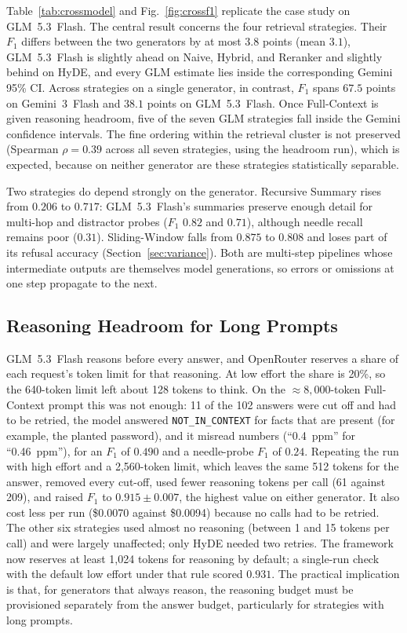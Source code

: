 \documentclass[conference,a4paper,10pt]{IEEEtran}
\begin{document}
Table~\ref{tab:crossmodel} and Fig.~\ref{fig:crossf1} replicate the case study on GLM~5.3~Flash.
The central result concerns the four retrieval strategies.
Their $F_1$ differs between the two generators by at most $3.8$ points (mean $3.1$), GLM~5.3~Flash is slightly ahead on Naive, Hybrid, and Reranker and slightly behind on HyDE, and every GLM estimate lies inside the corresponding Gemini 95\% CI.
Across strategies on a single generator, in contrast, $F_1$ spans $67.5$ points on Gemini~3~Flash and $38.1$ points on GLM~5.3~Flash.
Once Full-Context is given reasoning headroom, five of the seven GLM strategies fall inside the Gemini confidence intervals.
The fine ordering within the retrieval cluster is not preserved (Spearman $\rho = 0.39$ across all seven strategies, using the headroom run), which is expected, because on neither generator are these strategies statistically separable.

Two strategies do depend strongly on the generator.
Recursive Summary rises from $0.206$ to $0.717$: GLM~5.3~Flash's summaries preserve enough detail for multi-hop and distractor probes ($F_1$ $0.82$ and $0.71$), although needle recall remains poor ($0.31$).
Sliding-Window falls from $0.875$ to $0.808$ and loses part of its refusal accuracy (Section~\ref{sec:variance}).
Both are multi-step pipelines whose intermediate outputs are themselves model generations, so errors or omissions at one step propagate to the next.

\subsection{Reasoning Headroom for Long Prompts}
\label{sec:headroom}

GLM~5.3~Flash reasons before every answer, and OpenRouter reserves a share of each request's token limit for that reasoning.
At low effort the share is 20\%, so the 640-token limit left about 128 tokens to think.
On the $\approx 8{,}000$-token Full-Context prompt this was not enough: 11 of the 102 answers were cut off and had to be retried, the model answered \texttt{NOT\_IN\_CONTEXT} for facts that are present (for example, the planted password), and it misread numbers (``0.4~ppm'' for ``0.46~ppm''), for an $F_1$ of $0.490$ and a needle-probe $F_1$ of $0.24$.
Repeating the run with high effort and a 2{,}560-token limit, which leaves the same 512 tokens for the answer, removed every cut-off, used fewer reasoning tokens per call (61 against 209), and raised $F_1$ to $0.915 \pm 0.007$, the highest value on either generator.
It also cost less per run (\$0.0070 against \$0.0094) because no calls had to be retried.
The other six strategies used almost no reasoning (between 1 and 15 tokens per call) and were largely unaffected; only HyDE needed two retries.
The framework now reserves at least 1{,}024 tokens for reasoning by default; a single-run check with the default low effort under that rule scored $0.931$.
The practical implication is that, for generators that always reason, the reasoning budget must be provisioned separately from the answer budget, particularly for strategies with long prompts.
\end{document}
